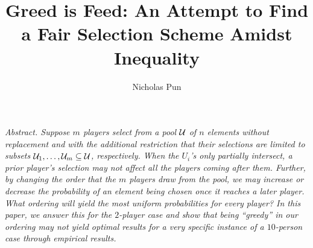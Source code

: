 \documentclass[11pt]{article}
\title{Greed is Feed: An Attempt to Find a Fair Selection Scheme Amidst Inequality}
\author{Nicholas Pun}
\begin{document}
\maketitle

\vspace{3mm}
\begin{center}
    \parbox{0.85\textwidth}{%
    \it{Abstract.}
    Suppose $m$ players select from a pool $\mathcal{U}$ of $n$ elements without replacement and with the additional restriction that their selections are limited to subsets $\mathcal{U}_1, \ldots, \mathcal{U}_m \subseteq \mathcal{U}$, respectively.
    When the $U_i$'s only partially intersect, a prior player's selection may not affect all the players coming after them.
    Further, by changing the order that the $m$ players draw from the pool, we may increase or decrease the probability of an element being chosen once it reaches a later player.
    What ordering will yield the most uniform probabilities for every player?
    In this paper, we answer this for the $2$-player case and show that being ``greedy'' in our ordering may not yield optimal results for a very specific instance of a $10$-person case through empirical results.}
\end{center}
\vspace{5mm}

{\small \tableofcontents}







\clearpage

\end{document}
